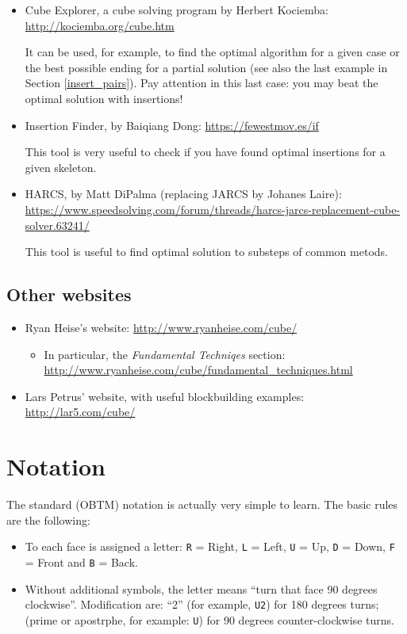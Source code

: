 \documentclass[11pt,a4paper]{book}
\newcommand{\p}{\textquotesingle}
\newcommand{\m}{\texttt}
\begin{document}
\begin{itemize}
\item Cube Explorer, a cube solving program by Herbert Kociemba: \url{http://kociemba.org/cube.htm}

It can be used, for example, to find the optimal algorithm for a given case or the best possible ending for a partial solution (see also the last example in Section \ref{insert_pairs}). Pay attention in this last case: you may beat the optimal solution with insertions!
\item Insertion Finder, by Baiqiang Dong: \url{https://fewestmov.es/if}

This tool is very useful to check if you have found optimal insertions for a given skeleton.
\item HARCS, by Matt DiPalma (replacing JARCS by Johanes Laire):\\ \url{https://www.speedsolving.com/forum/threads/harcs-jarcs-replacement-cube-solver.63241/}

This tool is useful to find optimal solution to substeps of common metods.
\end{itemize}

\section*{Other websites}

\begin{itemize}
\item Ryan Heise's website: \url{http://www.ryanheise.com/cube/}
\begin{itemize}
\item In particular, the \emph{Fundamental Techniqes} section: \url{http://www.ryanheise.com/cube/fundamental_techniques.html}
\end{itemize}
\item Lars Petrus' website, with useful blockbuilding examples: \url{http://lar5.com/cube/}
\end{itemize}

\chapter{Notation}
\label{notation}

The standard (OBTM) notation is actually very simple to learn. The basic rules are the following:

\begin{itemize}
\item To each face is assigned a letter: \m R = Right, \m L = Left, \m U = Up, \m D = Down, \m F = Front and \m B = Back.
\item Without additional symbols, the letter means ``turn that face 90 degrees clockwise''. Modification are: ``2'' (for example, \m{U2}) for 180 degrees turns; \p (prime or apostrphe, for example: \m{U\p}) for 90 degrees counter-clockwise turns.
\end{itemize}
\end{document}
